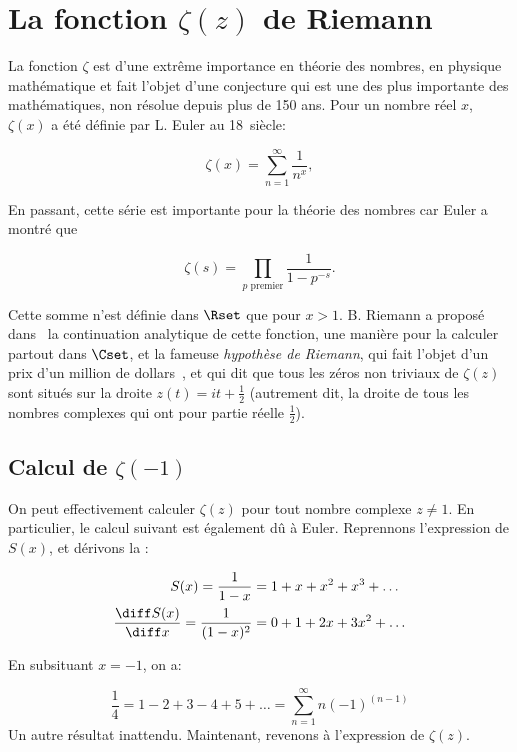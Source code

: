 \section{La fonction $\zeta(z)$ de Riemann}
La fonction $\zeta$ est d'une extrême importance en théorie des nombres, en physique mathématique et fait l'objet d'une conjecture qui est une des plus importante des mathématiques, non résolue depuis plus de 150 ans. Pour un nombre réel $x$, $\zeta(x)$ a été définie par L. Euler au 18\ieme~siècle:

\begin{equation}
\zeta(x) = \sum_{n=1}^\infty \frac{1}{n^x},
\end{equation}

En passant, cette série est importante pour la théorie des nombres car Euler a montré que

\begin{equation}
\zeta(s) = \prod_{p \text{ premier}}\frac{1}{1-p^{-s}}.
\end{equation}

Cette somme n'est définie dans $\Rset$ que pour $x > 1$. B. Riemann a proposé dans~\cite{Riemann1859} la continuation analytique de cette fonction, une manière pour la calculer partout dans $\Cset$, et la fameuse {\em hypothèse de Riemann}, qui fait l'objet d'un prix d'un million de dollars~\cite{RiemannHyp}, et qui dit que tous les \og zéros non triviaux \fg de $\zeta(z)$ sont situés sur la droite $z(t) = it + \frac{1}{2}$ (autrement dit, la droite de tous les nombres complexes qui ont pour partie réelle $\frac{1}{2}$).

\subsection{Calcul de $\zeta(-1)$}
On peut effectivement calculer $\zeta(z)$ pour tout nombre complexe $z \neq 1$. En particulier, le calcul suivant est également dû à Euler. Reprennons l'expression de $S(x)$, et dérivons la :

\begin{align}
S(x) = \frac{1}{1-x} &= 1 + x + x^2 + x^3 + \ldots\\
\frac{\diff S(x)}{\diff x} = \frac{1}{(1-x)^2} &= 0 + 1 + 2x + 3x^2 + \ldots
\end{align}

En subsituant $x = -1$, on a:

\begin{equation}
\frac{1}{4} = 1 - 2 + 3 - 4 + 5 + \ldots = \sum_{n=1}^\infty n(-1)^{(n-1)} 
\end{equation}
Un autre résultat inattendu. Maintenant, revenons à l'expression de $\zeta(z)$.

